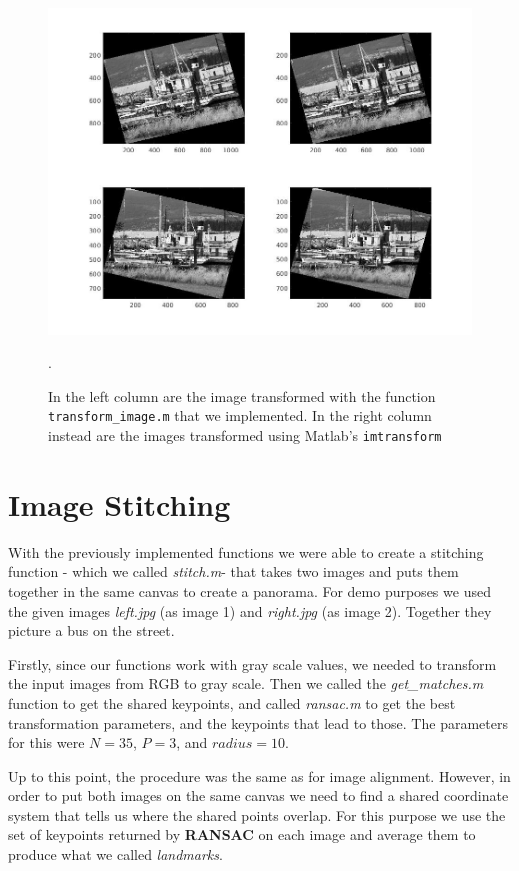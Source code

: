 \documentclass[11pt]{article}
\begin{document}
\begin{figure}[htpb]
	\centering
	\includegraphics[width=1\textwidth]{imgs/imtransform_vs_custom.jpg}
	\caption{In the left column are the image transformed with the function
		\texttt{transform\_image.m} that we implemented. In the right
		column instead are the images transformed using Matlab's
		\texttt{imtransform}}.
	\label{fig:imtransform_vs_custom}
\end{figure}



\section{Image Stitching}
With the previously implemented functions we were able to create a stitching function - which we called \textit{stitch.m}- that takes two images and puts them together in the same canvas to create a panorama. For demo purposes we used the given images \textit{left.jpg} (as image 1) and \textit{right.jpg} (as image 2). Together they picture a bus on the street. 
 
Firstly, since our functions work with gray scale values, we needed to transform the input images from RGB to gray scale. Then we called the \textit{get\_matches.m} function to get the shared keypoints, and called \textit{ransac.m} to get the best transformation parameters, and the keypoints that lead to those. The parameters for this were $N = 35$, $P = 3$, and $radius = 10$.

Up to this point, the procedure was the same as for image alignment. However, in order to put both images on the same canvas we need to find a shared coordinate system that tells us where the shared points overlap. For this purpose we use the set of keypoints returned by \textbf{RANSAC} on each image and average them to produce what we called \textit{landmarks}.
\end{document}
